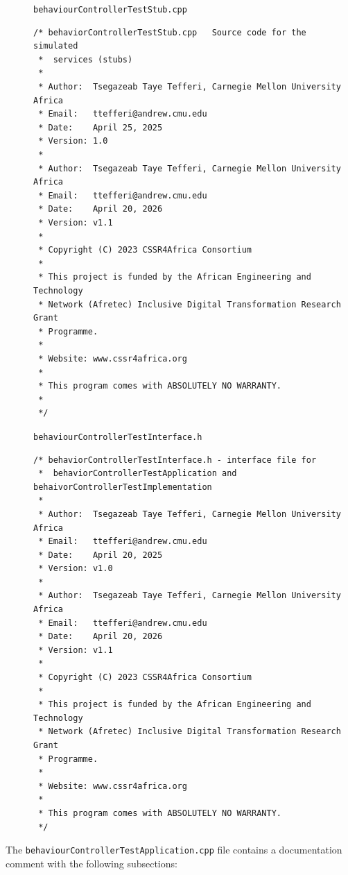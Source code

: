 \documentclass{CSSRforAfrica}
\newcommand{\blank}{~\\}
\newcommand{\checkboxChecked}{\fbox{\ding{51}}} %
\begin{document}
\begin{description}
\item[\checkboxChecked] {\small \verb+behaviourControllerTestStub.cpp+}  
{\small \begin{verbatim}
/* behaviorControllerTestStub.cpp   Source code for the simulated
 *  services (stubs)
 *
 * Author:  Tsegazeab Taye Tefferi, Carnegie Mellon University Africa
 * Email:   ttefferi@andrew.cmu.edu
 * Date:    April 25, 2025
 * Version: 1.0
 *
 * Author:  Tsegazeab Taye Tefferi, Carnegie Mellon University Africa
 * Email:   ttefferi@andrew.cmu.edu
 * Date:    April 20, 2026
 * Version: v1.1
 *
 * Copyright (C) 2023 CSSR4Africa Consortium
 *
 * This project is funded by the African Engineering and Technology
 * Network (Afretec) Inclusive Digital Transformation Research Grant
 * Programme.
 *
 * Website: www.cssr4africa.org
 *
 * This program comes with ABSOLUTELY NO WARRANTY.
 *
 */
\end{verbatim} }

\item[\checkboxChecked] {\small \verb+behaviourControllerTestInterface.h+}   
{\small \begin{verbatim}
/* behaviorControllerTestInterface.h - interface file for
 *  behaviorControllerTestApplication and behaivorControllerTestImplementation
 *
 * Author:  Tsegazeab Taye Tefferi, Carnegie Mellon University Africa
 * Email:   ttefferi@andrew.cmu.edu
 * Date:    April 20, 2025
 * Version: v1.0
 *
 * Author:  Tsegazeab Taye Tefferi, Carnegie Mellon University Africa
 * Email:   ttefferi@andrew.cmu.edu
 * Date:    April 20, 2026
 * Version: v1.1
 * 
 * Copyright (C) 2023 CSSR4Africa Consortium
 *
 * This project is funded by the African Engineering and Technology
 * Network (Afretec) Inclusive Digital Transformation Research Grant
 * Programme.
 *
 * Website: www.cssr4africa.org
 *
 * This program comes with ABSOLUTELY NO WARRANTY.
 */
\end{verbatim} }



\end{description} 
%

\noindent The {\small \verb+behaviourControllerTestApplication.cpp+} file contains a documentation comment with the following subsections:
\end{document}
